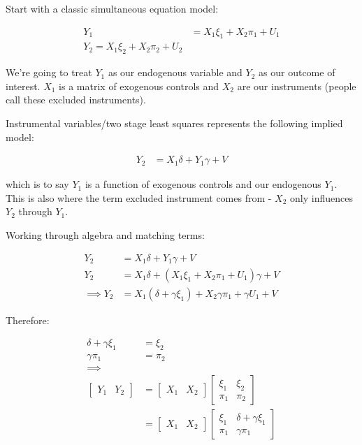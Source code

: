 \documentclass{article}
\begin{document}
   


Start with a classic simultaneous equation model:

\begin{align*}
    Y_1 &= X_1 \xi_1 + X_2 \pi_1 + U_1 \\
    Y_2 = X_1 \xi_2 + X_2 \pi_2 + U_2
\end{align*}

We're going to treat $Y_1$ as our endogenous variable and $Y_2$ as our outcome 
of interest. $X_1$ is a matrix of exogenous controls and $X_2$ are our instruments 
(people call these excluded instruments).

Instrumental variables/two stage least squares represents the following implied model:

\begin{align*}
    Y_2 &= X_1 \delta + Y_1 \gamma + V
\end{align*}


which is to say $Y_1$ is a function of exogenous controls and our endogenous $Y_1$. 
This is also where the term excluded instrument comes from - $X_2$ only influences 
$Y_2$ through $Y_1$.


Working through algebra and matching terms:

\begin{align*}
    Y_2 &= X_1 \delta + Y_1 \gamma + V \\
    Y_2 &= X_1 \delta + (X_1 \xi_1 + X_2 \pi_1 + U_1) \gamma + V \\
    \implies Y_2 &= X_1 (\delta + \gamma \xi_1) + X_2 \gamma \pi_1 + \gamma U_1 + V
\end{align*}

Therefore:

\begin{align*}
    \delta + \gamma \xi_1 &= \xi_2 \\
    \gamma \pi_1 &= \pi_2  \\
    \implies \\
    \begin{bmatrix}
        Y_1 & Y_2
    \end{bmatrix} &= \begin{bmatrix}
        X_1 & X_2
    \end{bmatrix}
    \begin{bmatrix}
        \xi_1 & \xi_2 \\
        \pi_1 & \pi_2
    \end{bmatrix}  \\
     &= \begin{bmatrix}
        X_1 & X_2
    \end{bmatrix}
    \begin{bmatrix}
        \xi_1 &  \delta + \gamma \xi_1 \\
        \pi_1 & \gamma \pi_1
    \end{bmatrix} 
\end{align*}
\end{document}
